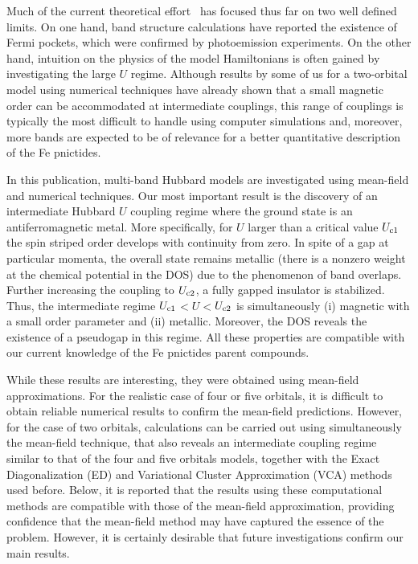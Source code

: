 \documentclass[aps,prb,superscriptaddress,preprintnumbers,
showpacs,legalpaper,twoside,twocolumn,amsmath,amssymb]{revtex4}
\begin{document}
Much of the current theoretical
effort~\cite{daghofer,si,kuroki,mazin,FCZhang,han,korshunov,baskaran,yao,
  xu2,plee,yildirim,scalapino,hu,zhou,lorenzana,sk,parish,choi,wang,yang,shi,2orbitals,calderon}
has focused thus far on two well defined limits. On one hand,
band structure calculations have reported the existence of Fermi pockets,\cite{singh,first, xu, cao, fang2}
which were confirmed by
photoemission
experiments.\cite{hashimoto,arpes,arpes2,C.Martin,T.Chen,parker,arpes3}
On the other hand,
intuition on the physics of the model Hamiltonians is often gained
by investigating the large $U$ regime.
Although results by some of us for a two-orbital model
using numerical techniques
have already shown that a small magnetic order can be accommodated
at intermediate couplings,\cite{daghofer}
this range of couplings
is typically the most difficult to handle using computer simulations
and, moreover, more bands are expected to be of relevance for a better quantitative
description of the Fe pnictides.

In this publication, multi-band Hubbard models are investigated
using mean-field and numerical techniques. Our most important result is the discovery of an
intermediate Hubbard $U$ coupling regime where the ground state is an antiferromagnetic metal.
More specifically, for $U$ larger than a critical value $U_{\rm c1}$
the spin striped order develops with continuity from zero.
In spite of a gap at particular momenta, the overall state remains metallic (there is a nonzero
weight at the chemical potential in the DOS) due
to the phenomenon of band overlaps. Further increasing the coupling to $U_{\rm c2}$, a fully gapped
insulator is stabilized. Thus, the intermediate regime $U_{\rm c1}$$<$$U$$<$$U_{\rm c2}$ is
simultaneously (i) magnetic with a small order parameter and (ii) metallic. Moreover,
the DOS reveals the existence of a pseudogap in this regime. All these properties are compatible with our
current knowledge of the Fe pnictides parent compounds.

While these results are interesting, they were obtained using mean-field approximations. For the
realistic case of four or five orbitals, it is difficult to obtain reliable
numerical results
to confirm the mean-field predictions.
However, for the case of two orbitals, calculations can be carried out using
simultaneously the mean-field technique, that also reveals
an intermediate coupling regime similar to that
of the four and five orbitals models,
together with the Exact Diagonalization (ED)\cite{RMP} and Variational Cluster Approximation (VCA)\cite{Aic03,Pot03} methods used
before.\cite{daghofer} Below, it is reported that the results using these
computational methods are compatible with
those of the mean-field approximation, providing
confidence that the mean-field method
may have captured the essence of the problem. However, it is certainly desirable that
future investigations confirm our main results.
\end{document}
